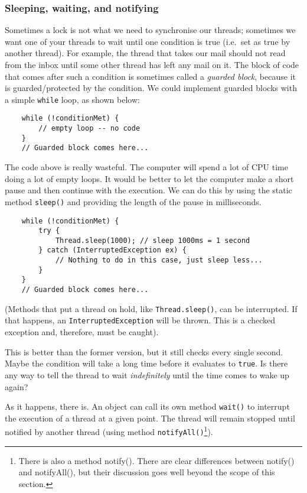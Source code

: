 \subsubsection{Sleeping, waiting, and notifying}
\label{sec:sleep-wait-notify}

Sometimes a lock is not what we need to synchronise our threads; 
sometimes we want one of your threads to wait until one condition is
true (i.e.~set as true by another thread). For example, the thread
that takes our mail should not read from the inbox until some other
thread has left any mail on it. The block of code that comes after
such a condition is sometimes called a \emph{guarded block}, because
it is guarded/protected by the condition. We could implement guarded
blocks with a simple \verb+while+ loop, as shown below:

\begin{verbatim}
    while (!conditionMet) { 
        // empty loop -- no code
    }
    // Guarded block comes here...
\end{verbatim}

The code above is really wasteful. The computer will spend a lot of
CPU time doing a lot of empty loops. It would be
better to let the computer make a short pause and then continue with
the execution. We can do this by using the static method
\verb+sleep()+ and providing the length of the pause in milliseconds. 

\begin{verbatim}
    while (!conditionMet) {
        try {
            Thread.sleep(1000); // sleep 1000ms = 1 second
        } catch (InterruptedException ex) {
            // Nothing to do in this case, just sleep less...
        }
    }  
    // Guarded block comes here...
\end{verbatim}

(Methods that put a thread on hold, like \verb+Thread.sleep()+, can be
interrupted. If that happens, an \verb+InterruptedException+ will be
thrown. This is a checked exception and, therefore, must be caught).

This is better than the former version, but it still checks every
single second. Maybe the condition will take a long time before it
evaluates to \verb+true+. Is there any way to tell the thread to wait
\emph{indefinitely} until the time comes to wake up again? 

As it happens, there is. An object can call its own method
\verb+wait()+ to interrupt 
the execution of a thread at a given point. The thread will remain
stopped until notified by another thread (using method
\verb+notifyAll()+\footnote{There is also a method notify(). There are
clear differences between notify() and notifyAll(), but their
discussion goes well beyond the scope of this section.}). 

